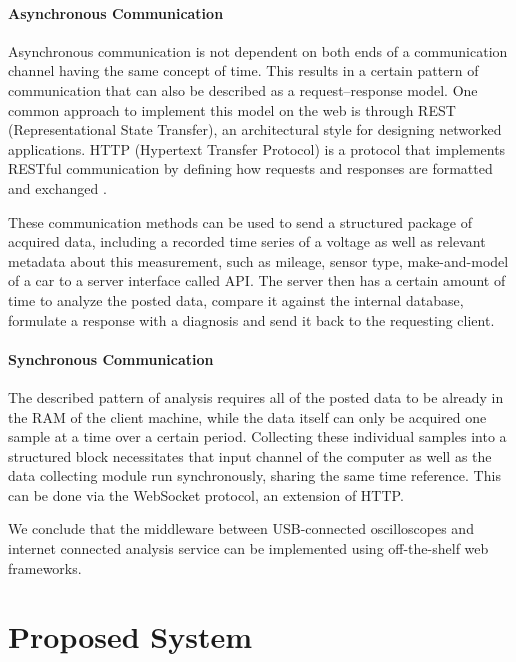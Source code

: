 \documentclass[conference,a4paper]{IEEEtran}
\begin{document}
\paragraph{Asynchronous Communication}
Asynchronous communication is not dependent on both ends of a communication channel having the same concept of time. 
This results in a certain pattern of communication that can also be described as a request–response model. 
One common approach to implement this model on the web is through REST (Representational State Transfer), an architectural style for designing networked applications. 
HTTP (Hypertext Transfer Protocol) is a protocol that implements RESTful communication by defining how requests and responses are formatted and exchanged \cite{Fielding2000}.

These communication methods can be used to send a structured package of acquired data, including a recorded time series of a voltage as well as relevant metadata about this measurement, 
such as mileage, sensor type, make-and-model of a car to a server interface called API. 
The server then has a certain amount of time to analyze the posted data, compare it against the internal database, formulate a response with a diagnosis and send it back to the requesting client.

\paragraph{Synchronous Communication}
The described pattern of analysis requires all of the posted data to be already in the RAM of the client machine, while the data itself can only be acquired one sample at a time over a certain period. 
Collecting these individual samples into a structured block necessitates that input channel of the computer as well as the data collecting module run synchronously, sharing the same time reference. 
This can be done via the WebSocket protocol, an extension of HTTP.

We conclude that the middleware between USB-connected oscilloscopes and internet connected analysis service can be implemented using off-the-shelf web frameworks.

\section{Proposed System}
\end{document}
